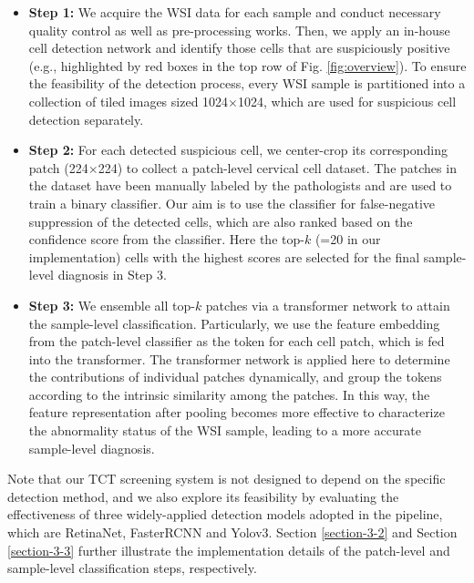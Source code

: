\begin{itemize}
    \item 
    \textbf{Step 1:} We acquire the WSI data for each sample and conduct necessary quality control as well as pre-processing works. 
    Then, we apply an in-house cell detection network and identify those cells that are suspiciously positive (e.g., highlighted by red boxes  in the top row of Fig. \ref{fig:overview}). To ensure the feasibility of the detection process, every WSI sample is partitioned into a collection of tiled images sized 1024$\times$1024, which are used for suspicious cell detection separately. 
    \item 
    \textbf{Step 2:}  For each detected suspicious cell, we center-crop its corresponding patch (224$\times$224) to collect a patch-level cervical cell dataset. The patches in the dataset have been manually labeled by the pathologists and are used to train a binary classifier. Our aim is to use the classifier for false-negative suppression of the detected cells, which are also ranked based on the confidence score from the classifier. Here the top-$k$ (=20 in our implementation) cells with the highest scores are selected for the final sample-level diagnosis in Step 3. 
    \item 
    \textbf{Step 3:} We ensemble all top-$k$ patches via a transformer network to attain the sample-level classification. Particularly, we use the feature embedding from the patch-level classifier as the token for each cell patch, which is fed into the transformer. The transformer network is applied here to determine the contributions of individual patches dynamically, and group the tokens according to the intrinsic similarity among the patches. In this way, the feature representation after pooling becomes more effective to characterize the abnormality status of the WSI sample, leading to a more accurate sample-level diagnosis.
\end{itemize}

Note that our TCT screening system is not designed to depend on the specific detection method, and we also explore its feasibility by evaluating the effectiveness of three widely-applied detection models adopted in the pipeline, which are RetinaNet, FasterRCNN and Yolov3. Section \ref{section-3-2} and Section \ref{section-3-3} further illustrate the implementation details of the patch-level and sample-level classification steps, respectively.


